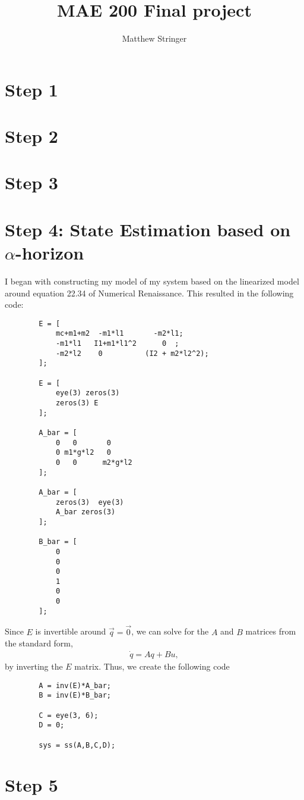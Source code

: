 \documentclass{article}
\title{MAE 200 Final project}
\author{Matthew Stringer}
\date{}
\theoremstyle{definition}
\begin{document}
    \maketitle
    \section*{Step 1}
    
    \section*{Step 2}
    
    \section*{Step 3}

    \section*{Step 4: State Estimation based on $\alpha$-horizon}
    I began with constructing my model of my system based on the linearized
    model around equation 22.34 of Numerical Renaissance. 
    This resulted in the following code:
    \begin{verbatim}
        E = [
            mc+m1+m2  -m1*l1       -m2*l1;
            -m1*l1   I1+m1*l1^2      0  ;
            -m2*l2    0          (I2 + m2*l2^2);
        ];

        E = [
            eye(3) zeros(3)
            zeros(3) E
        ];

        A_bar = [
            0   0       0
            0 m1*g*l2   0
            0   0      m2*g*l2
        ];

        A_bar = [ 
            zeros(3)  eye(3) 
            A_bar zeros(3)
        ];

        B_bar = [
            0
            0
            0
            1
            0
            0
        ];
    \end{verbatim}
    Since $E$ is invertible around $\vec q = \vec 0$, we can solve for 
    the $A$ and $B$ matrices from the standard form,
    \begin{eqnarray*}
        \dot q = A q + B u,
    \end{eqnarray*}
    by inverting the $E$ matrix. 
    Thus, we create the following code
    \begin{verbatim}
        A = inv(E)*A_bar;
        B = inv(E)*B_bar;

        C = eye(3, 6);
        D = 0;

        sys = ss(A,B,C,D);
    \end{verbatim}

    \section*{Step 5}
\end{document}
